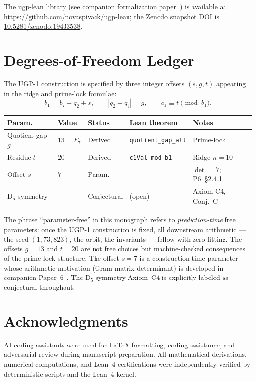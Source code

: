 \documentclass[12pt]{article}
\numberwithin{equation}{section}
\begin{document}
\bigskip
\noindent The ugp-lean library (see companion formalization paper~\cite{SpivackUGPFormalization}) is available at \url{https://github.com/novaspivack/ugp-lean}; the Zenodo snapshot DOI is \href{https://doi.org/10.5281/zenodo.19433538}{10.5281/zenodo.19433538}.

\section{Degrees-of-Freedom Ledger}\label{app:dof}

The UGP-1 construction is specified by three integer offsets $(s, g, t)$ appearing in the ridge and prime-lock formulae:
\[
b_1 = b_2 + q_2 + s, \qquad |q_2 - q_1| = g, \qquad c_1 \equiv t \pmod{b_1}.
\]

\begin{center}
\small
\small
\begin{tabular}{@{}p{2.2cm}p{1.4cm}p{2.4cm}p{3.6cm}p{3.4cm}@{}}
\toprule
\textbf{Param.} & \textbf{Value} & \textbf{Status} & \textbf{Lean theorem} & \textbf{Notes} \\
\midrule
Quotient gap $g$ & $13 = F_7$ & Derived & \footnotesize\texttt{quotient\_gap\_all} & Prime-lock \\
Residue $t$ & $20$ & Derived & \footnotesize\texttt{c1Val\_mod\_b1} & Ridge $n{=}10$ \\
Offset $s$ & $7$ & Param. & --- & $\det{=}7$; P6~§2.4.1 \\
\midrule
D$_5$ symmetry & --- & Conjectural & (open) & Axiom C4, Conj.~C \\
\bottomrule
\end{tabular}
\normalsize
\normalsize
\end{center}

\smallskip
\noindent The phrase ``parameter-free'' in this monograph refers to \emph{prediction-time} free parameters: once the UGP-1 construction is fixed, all downstream arithmetic — the seed $(1,73,823)$, the orbit, the invariants — follow with zero fitting. The offsets $g=13$ and $t=20$ are not free choices but machine-checked consequences of the prime-lock structure. The offset $s=7$ is a construction-time parameter whose arithmetic motivation (Gram matrix determinant) is developed in companion Paper~6~\cite{Spivack2025_UGPMathFoundations}. The D$_5$ symmetry Axiom~C4 is explicitly labeled as conjectural throughout.





\section*{Acknowledgments}

AI coding assistants were used for LaTeX formatting, coding assistance, and adversarial review during manuscript preparation. All mathematical derivations, numerical computations, and Lean~4 certifications were independently verified by deterministic scripts and the Lean~4 kernel.
\end{document}
